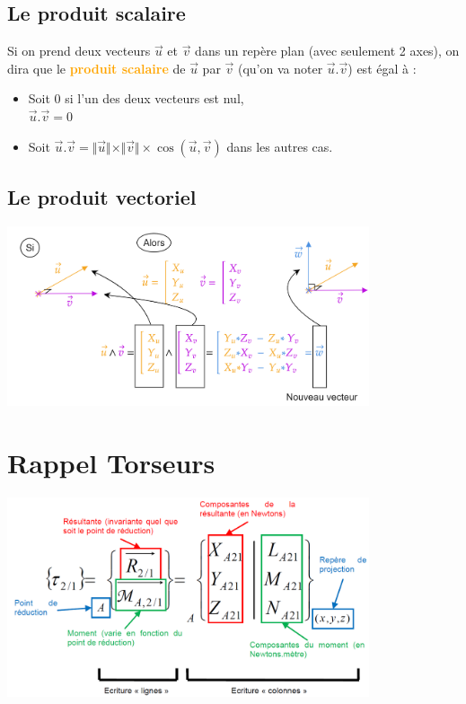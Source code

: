 \documentclass[12pt]{article}
\begin{document}
\subsection{Le produit scalaire}
Si on prend deux vecteurs $\Vec{u}$ et $\Vec{v}$ dans un repère plan (avec seulement 2 axes), on dira que le \textcolor{orange}{\textbf{produit scalaire}} de $\Vec{u}$ par $\Vec{v}$ (qu'on va noter $\Vec{u}.\Vec{v}$) est égal à : 
\begin{itemize}
    \item Soit 0 si l'un des deux vecteurs est nul, \\
    $\Vec{u}.\Vec{v}=0$
    \item Soit  $\Vec{u}.\Vec{v}=\Vert\vec{u}\Vert \times \Vert\vec{v}\Vert \times \cos{(\Vec{u},\Vec{v})}$ dans les autres cas.
\end{itemize}


\subsection{Le produit vectoriel}
        \begin{center}
            \includegraphics[width=0.8\textwidth]{DD24.png}
        \end{center}


\section{Rappel Torseurs}
        \begin{center}
            \includegraphics[width=0.8\textwidth]{DD23.png}
        \end{center}
\end{document}
